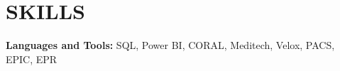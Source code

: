 
\section{\textcolor{airforceblue}{SKILLS}}
 \begin{itemize}[leftmargin=0in, label={}]
    \small{\item{
     \textbf{Languages and Tools:}{ SQL, Power BI, CORAL, Meditech, Velox, PACS, EPIC, EPR} \\
      \vspace{1.2pt}
     }}
 \end{itemize}
 \vspace{-10pt}
